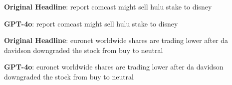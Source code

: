 \begin{tcolorbox}[colback=white,colframe=black!75!white] 
    \begin{minipage}{0.475\textwidth}
    \centering
    \begin{tcolorbox}[colback=black!5!white,colframe=black!75!white, fontupper=\small, fontlower=\small] 
    \textbf{Original Headline}: report comcast might sell hulu stake to disney
    \end{tcolorbox}
    \end{minipage} 
    \hfill
    \begin{minipage}{0.475\textwidth}
    \centering
    \begin{tcolorbox}[colback=black!5!white,colframe=black!75!white, fontupper=\small, fontlower=\small] 
    \textbf{GPT-4o}: report comcast might sell hulu stake to disney
    \end{tcolorbox}
    \end{minipage}
\end{tcolorbox}
\begin{tcolorbox}[colback=white,colframe=black!75!white] 
    \begin{minipage}{0.475\textwidth}
    \centering
    \begin{tcolorbox}[colback=black!5!white,colframe=black!75!white, fontupper=\small, fontlower=\small] 
    \textbf{Original Headline}: euronet worldwide shares are trading lower after da davidson downgraded the stock from buy to neutral
    \end{tcolorbox}
    \end{minipage} 
    \hfill
    \begin{minipage}{0.475\textwidth}
    \centering
    \begin{tcolorbox}[colback=black!5!white,colframe=black!75!white, fontupper=\small, fontlower=\small] 
    \textbf{GPT-4o}: euronet worldwide shares are trading lower after da davidson downgraded the stock from buy to neutral
    \end{tcolorbox}
    \end{minipage}
\end{tcolorbox}